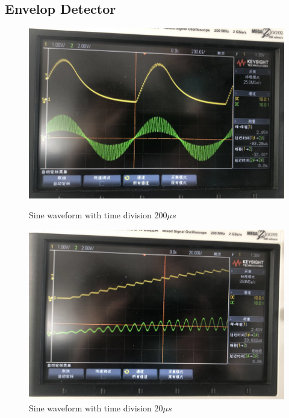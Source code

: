 \documentclass[12pt]{article}
\begin{document}
\subsection{Envelop Detector}
\begin{figure}[H]
\centering
\includegraphics[scale=0.6]{P16.jpg}
\caption{Sine waveform with time division 200$\mu s$}
\includegraphics[scale=0.6]{P17.jpg}
\caption{Sine waveform with time division 20$\mu s$}
\end{figure}
\end{document}
